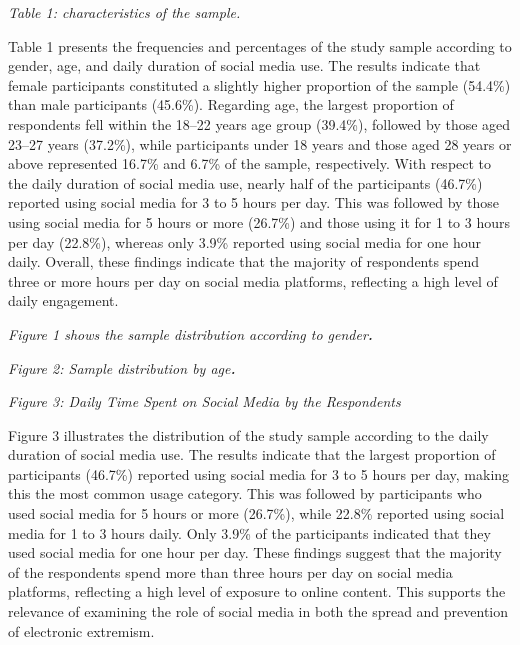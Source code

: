 \documentclass[11pt,a4paper]{article}
\begin{document}
	\textit{Table 1: characteristics of the sample.}
	
	Table 1 presents the frequencies and percentages of the study sample according to gender, age, and daily duration of social media use. The results indicate that female participants constituted a slightly higher proportion of the sample (54.4\%) than male participants (45.6\%). Regarding age, the largest proportion of respondents fell within the 18--22 years age group (39.4\%), followed by those aged 23--27 years (37.2\%), while participants under 18 years and those aged 28 years or above represented 16.7\% and 6.7\% of the sample, respectively. With respect to the daily duration of social media use, nearly half of the participants (46.7\%) reported using social media for 3 to 5 hours per day. This was followed by those using social media for 5 hours or more (26.7\%) and those using it for 1 to 3 hours per day (22.8\%), whereas only 3.9\% reported using social media for one hour daily. Overall, these findings indicate that the majority of respondents spend three or more hours per day on social media platforms, reflecting a high level of daily engagement.
	
	\begin{figure}[h]
		\centering
	\end{figure}
	
	\textit{Figure 1 shows the sample distribution according to gender}\textbf{\textit{.}}
	
	\textit{Figure 2: Sample distribution by age}\textbf{\textit{.}}
	
	\begin{figure}[h]
		\centering
	\end{figure}
	
	\textit{Figure 3: Daily Time Spent on Social Media by the Respondents   }
	
	Figure 3 illustrates the distribution of the study sample according to the daily duration of social media use. The results indicate that the largest proportion of participants (46.7\%) reported using social media for 3 to 5 hours per day, making this the most common usage category. This was followed by participants who used social media for 5 hours or more (26.7\%), while 22.8\% reported using social media for 1 to 3 hours daily. Only 3.9\% of the participants indicated that they used social media for one hour per day. These findings suggest that the majority of the respondents spend more than three hours per day on social media platforms, reflecting a high level of exposure to online content. This supports the relevance of examining the role of social media in both the spread and prevention of electronic extremism.
	
\end{document}
